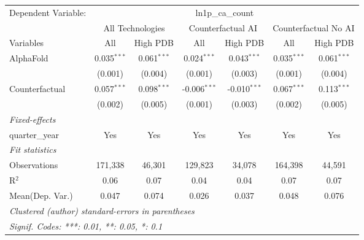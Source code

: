 \begingroup
\centering
\begin{tabular}{lcccccc}
   \tabularnewline \midrule \midrule
   Dependent Variable: & \multicolumn{6}{c}{ln1p\_ca\_count}\\
 & \multicolumn{2}{c}{All Technologies} & \multicolumn{2}{c}{Counterfactual AI} & \multicolumn{2}{c}{Counterfactual No AI} \\
\cmidrule(lr){1-1}\cmidrule(lr){2-3} \cmidrule(lr){4-5} \cmidrule(lr){6-7}
Variables & \multicolumn{1}{c}{All} & \multicolumn{1}{c}{High PDB} & \multicolumn{1}{c}{All} & \multicolumn{1}{c}{High PDB} & \multicolumn{1}{c}{All} & \multicolumn{1}{c}{High PDB} \\
\cmidrule(lr){1-1}\cmidrule(lr){2-2} \cmidrule(lr){3-3} \cmidrule(lr){4-4} \cmidrule(lr){5-5} \cmidrule(lr){6-6} \cmidrule(lr){7-7}
   AlphaFold      & 0.035$^{***}$ & 0.061$^{***}$ & 0.024$^{***}$  & 0.043$^{***}$  & 0.035$^{***}$ & 0.061$^{***}$\\   
                  & (0.001)       & (0.004)       & (0.001)        & (0.003)        & (0.001)       & (0.004)\\   
   Counterfactual & 0.057$^{***}$ & 0.098$^{***}$ & -0.006$^{***}$ & -0.010$^{***}$ & 0.067$^{***}$ & 0.113$^{***}$\\   
                  & (0.002)       & (0.005)       & (0.001)        & (0.003)        & (0.002)       & (0.005)\\   
   \midrule
   \emph{Fixed-effects}\\
   quarter\_year  & Yes           & Yes           & Yes            & Yes            & Yes           & Yes\\  
   \midrule
   \emph{Fit statistics}\\
   Observations   & 171,338       & 46,301        & 129,823        & 34,078         & 164,398       & 44,591\\  
   R$^2$          & 0.06          & 0.07          & 0.04           & 0.04           & 0.07          & 0.07\\  
Mean(Dep. Var.) & 0.047 & 0.074 & 0.026 & 0.037 & 0.048 & 0.076 \\
   \midrule \midrule
   \multicolumn{7}{l}{\emph{Clustered (author) standard-errors in parentheses}}\\
   \multicolumn{7}{l}{\emph{Signif. Codes: ***: 0.01, **: 0.05, *: 0.1}}\\
\end{tabular}
\par\endgroup
